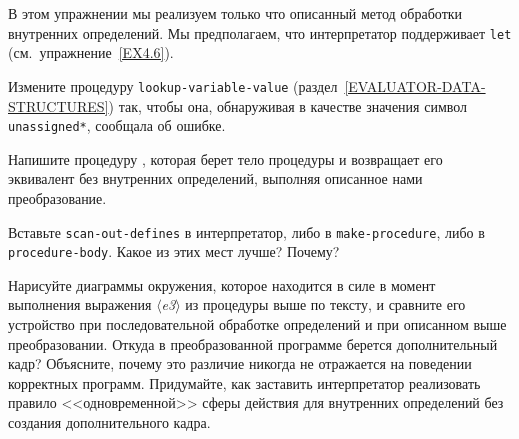 \begin{exercise}{4.16}\label{EX4.16}%
В этом упражнении мы реализуем только что описанный метод
обработки внутренних определений.  Мы предполагаем, что интерпретатор
поддерживает {\tt let} (см.~уп\-ра\-ж\-нение~\ref{EX4.6}).

\begin{plainenum}
\item

Измените процедуру
{\tt lookup-variable-value} 
(раздел~\ref{EVALUATOR-DATA-STRUCTURES}) так, 
чтобы она, обнаруживая
в качестве значения символ {\tt *unassigned*}, сообщала
об ошибке.

\item
Напишите процедуру  ,
которая берет тело процедуры и возвращает его эквивалент без
внутренних определений, выполняя описанное нами преобразование.

\item
Вставьте {\tt scan-out-defines} в
интерпретатор, либо в {\tt make-procedure}, либо в
{\tt pro\-ce\-dure-body}.  Какое из этих мест лучше? Почему?
\sloppy
\end{plainenum}
\end{exercise}

\begin{exercise}{4.17}%
\label{EX4.17}%
Нарисуйте диаграммы окружения, которое находится в силе в момент выполнения
выражения \textit{$\langle$e3$\rangle$} из процедуры выше по тексту, и
сравните его устройство при последовательной обработке определений и
при описанном выше преобразовании.
Откуда в преобразованной программе берется дополнительный кадр?
Объясните, почему это различие никогда не отражается на поведении
корректных программ.  Придумайте, как заставить интерпретатор
реализовать правило <<одновременной>> сферы действия для внутренних
определений без создания дополнительного кадра.
\end{exercise}

